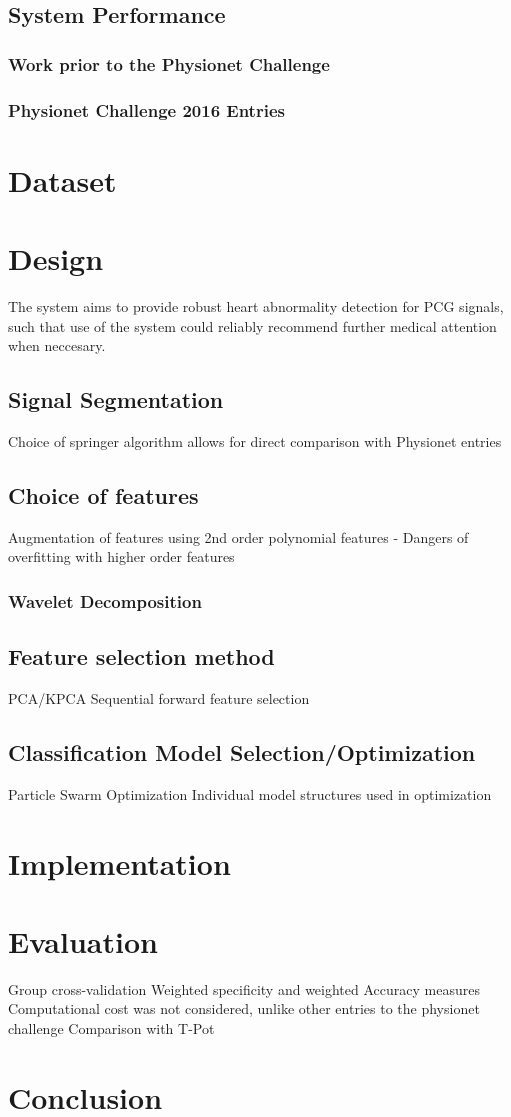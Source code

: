 \documentclass[titlepage, 12pt]{scrartcl} \usepackage{enumitem}
\begin{document}
\subsection{System Performance}\label{performance}
\subsubsection{Work prior to the Physionet Challenge}
\subsubsection{Physionet Challenge 2016 Entries}


\section{Dataset}

\section{Design}
The system aims to provide robust heart abnormality detection for PCG signals,
such that use of the system could reliably recommend further medical attention
when neccesary.
\subsection{Signal Segmentation}
Choice of springer algorithm allows for direct comparison with Physionet
entries
\subsection{Choice of features}

Augmentation of features using 2nd order polynomial features
- Dangers of overfitting with higher order features
\subsubsection{Wavelet Decomposition}
\subsection{Feature selection method}
PCA/KPCA
Sequential forward feature selection
\subsection{Classification Model Selection/Optimization}
Particle Swarm Optimization
Individual model structures used in optimization

\section{Implementation}
\section{Evaluation}
Group cross-validation
Weighted specificity and weighted Accuracy measures
Computational cost was not considered, unlike other entries to the physionet
challenge
Comparison with T-Pot
\section{Conclusion}



\pagebreak{}
\printbibliography{}
\end{document}
